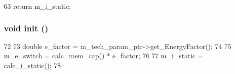 \begin{DoxyCode}
63 { return m_i_static; }
\end{DoxyCode}
\hypertarget{classMemUnit_a02fd73d861ef2e4aabb38c0c9ff82947}{
\subsubsection[{init}]{\setlength{\rightskip}{0pt plus 5cm}void init ()}}
\label{classMemUnit_a02fd73d861ef2e4aabb38c0c9ff82947}



\begin{DoxyCode}
72 {
73     double e_factor = m_tech_param_ptr->get_EnergyFactor();
74 
75     m_e_switch = calc_mem_cap() * e_factor;
76 
77     m_i_static = calc_i_static();
78 }
\end{DoxyCode}


